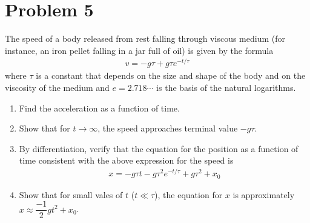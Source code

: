\documentclass[12pt]{article}
\begin{document}
\section*{Problem 5}
The speed of a body released from rest falling through viscous medium (for instance, an iron pellet falling in a jar full of oil) is given by the formula 
\begin{align}
v=-g\tau+g\tau e^{-t/\tau}
\end{align}
where $\tau$ is a constant that depends on the size and shape of the body and on the viscosity of the medium and $e=2.718\cdots$ is the basis of the natural logarithms.
\begin{enumerate}[label=(\roman*)]
\item Find the acceleration as a function of time.
\item Show that for $t\rightarrow\infty$, the speed approaches terminal value $-g\tau$.
\item By differentiation, verify that the equation for the position as a function of time consistent with the above expression for the speed is 
\begin{align}
x=-g\tau t-g\tau^{2}e^{-t/\tau}+g\tau^{2}+x_{0}
\end{align}
\item Show that for small vales of $t$ ($t\ll\tau$), the equation for $x$ is approximately $x\approx \dfrac{-1}{2}gt^{2}+x_{0}$.
\end{enumerate}
\end{document}

